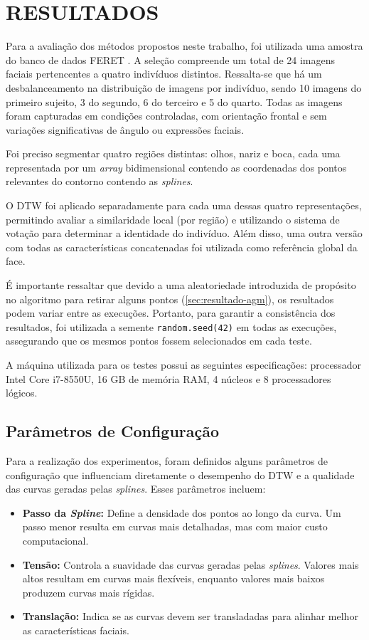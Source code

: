 \chapter{RESULTADOS} \label{cha:resultados}

Para a avaliação dos métodos propostos neste trabalho, foi utilizada uma amostra do banco de dados FERET \cite{FERET1,FERET2}. A seleção compreende um total de 24 imagens faciais pertencentes a quatro indivíduos distintos. Ressalta-se que há um desbalanceamento na distribuição de imagens por indivíduo, sendo 10 imagens do primeiro sujeito, 3 do segundo, 6 do terceiro e 5 do quarto. Todas as imagens foram capturadas em condições controladas, com orientação frontal e sem variações significativas de ângulo ou expressões faciais.

Foi preciso segmentar quatro regiões distintas: olhos, nariz e boca, cada uma representada por um \textit{array} bidimensional contendo as coordenadas dos pontos relevantes do contorno contendo as \textit{splines}.

O DTW foi aplicado separadamente para cada uma dessas quatro representações, permitindo avaliar a similaridade local (por região) e utilizando o sistema de votação para determinar a identidade do indivíduo. Além disso, uma outra versão com todas as características concatenadas foi utilizada como referência global da face.

É importante ressaltar que devido a uma aleatoriedade introduzida de propósito no algoritmo para retirar alguns pontos (\autoref{sec:resultado-agm}), os resultados podem variar entre as execuções. Portanto, para garantir a consistência dos resultados, foi utilizada a semente \texttt{random.seed(42)} em todas as execuções, assegurando que os mesmos pontos fossem selecionados em cada teste.

A máquina utilizada para os testes possui as seguintes especificações: processador Intel Core i7-8550U, 16 GB de memória RAM, 4 núcleos e 8 processadores lógicos.

\section{Parâmetros de Configuração}
\label{sec:parametros-configuracao}

Para a realização dos experimentos, foram definidos alguns parâmetros de configuração que influenciam diretamente o desempenho do DTW e a qualidade das curvas geradas pelas \textit{splines}. Esses parâmetros incluem:
\begin{itemize}
    \item \textbf{Passo da \textit{Spline}:} Define a densidade dos pontos ao longo da curva. Um passo menor resulta em curvas mais detalhadas, mas com maior custo computacional.
    \item \textbf{Tensão:} Controla a suavidade das curvas geradas pelas \textit{splines}. Valores mais altos resultam em curvas mais flexíveis, enquanto valores mais baixos produzem curvas mais rígidas. %
    \item \textbf{Translação:} Indica se as curvas devem ser transladadas para alinhar melhor as características faciais.
\end{itemize}

